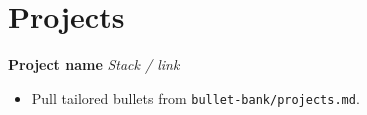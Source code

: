 \section*{Projects}

\textbf{Project name} \hfill \textit{Stack / link}
\begin{itemize}
  \item Pull tailored bullets from \texttt{bullet-bank/projects.md}.
\end{itemize}
